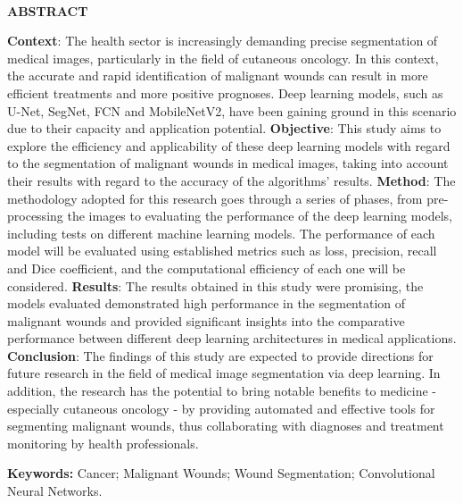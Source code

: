 \begin{center}
    \textbf{\\ABSTRACT \\ }
\end{center}

\textbf{Context}: The health sector is increasingly demanding precise segmentation of medical images, particularly in the field of cutaneous oncology. In this context, the accurate and rapid identification of malignant wounds can result in more efficient treatments and more positive prognoses. Deep learning models, such as \acf{U-Net}, \acf{SegNet}, \acf{FCN} and \acf{MobileNetV2}, have been gaining ground in this scenario due to their capacity and application potential. \textbf{Objective}: This study aims to explore the efficiency and applicability of these deep learning models with regard to the segmentation of malignant wounds in medical images, taking into account their results with regard to the accuracy of the algorithms' results. \textbf{Method}: The methodology adopted for this research goes through a series of phases, from pre-processing the images to evaluating the performance of the deep learning models, including tests on different machine learning models. The performance of each model will be evaluated using established metrics such as loss, precision, recall and Dice coefficient, and the computational efficiency of each one will be considered. \textbf{Results}: The results obtained in this study were promising, the models evaluated demonstrated high performance in the segmentation of malignant wounds and provided significant insights into the comparative performance between different deep learning architectures in medical applications. \textbf{Conclusion}: The findings of this study are expected to provide directions for future research in the field of medical image segmentation via deep learning. In addition, the research has the potential to bring notable benefits to medicine - especially cutaneous oncology - by providing automated and effective tools for segmenting malignant wounds, thus collaborating with diagnoses and treatment monitoring by health professionals.

\textbf{Keywords:} Cancer; Malignant Wounds; Wound Segmentation; Convolutional Neural Networks.